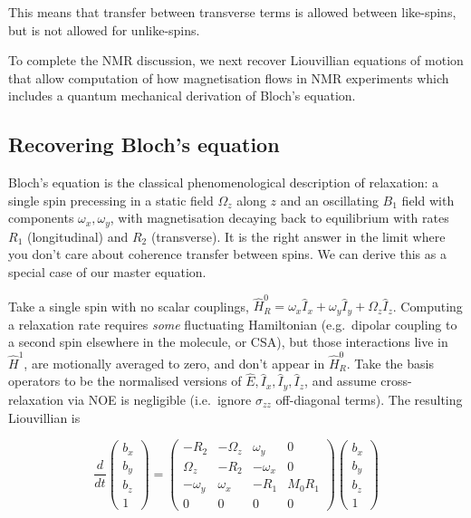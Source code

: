 \documentclass[notitlepage,11pt]{article}
\begin{document}
This means that transfer between transverse terms is allowed between like-spins, but is not allowed for unlike-spins.

To complete the NMR discussion, we next recover Liouvillian equations of motion that allow computation of how magnetisation flows in NMR experiments which includes a quantum mechanical derivation of Bloch's equation.


\subsection{Recovering Bloch's equation}

Bloch's equation is the classical phenomenological description of relaxation: a single spin precessing in a static field $\Omega_z$ along $z$ and an oscillating $B_1$ field with components $\omega_x,\omega_y$, with magnetisation decaying back to equilibrium with rates $R_1$ (longitudinal) and $R_2$ (transverse). It is the right answer in the limit where you don't care about coherence transfer between spins. We can derive this as a special case of our master equation.

Take a single spin with no scalar couplings, $\hat{H}^0_R= \omega_x \hat{I}_x + \omega_y \hat{I}_y + \Omega_z \hat{I}_z$. Computing a relaxation rate requires \emph{some} fluctuating Hamiltonian (e.g.\ dipolar coupling to a second spin elsewhere in the molecule, or CSA), but those interactions live in $\hat{H}^1$, are motionally averaged to zero, and don't appear in $\hat{H}^0_R$. Take the basis operators to be the normalised versions of $\hat{E},\hat{I}_x,\hat{I}_y,\hat{I}_z$, and assume cross-relaxation via NOE is negligible (i.e.\ ignore $\sigma_{zz}$ off-diagonal terms). The resulting Liouvillian is

    \begin{equation}
     \frac{d}{dt} \left(\begin{array}{c}  b_x \\ b_y \\ b_z \\ 1  \end{array}\right) = \left(\begin{array}{cccc} -R_2 &  -\Omega_z & \omega_y &  0 \\ \Omega_z & -R_2 & -\omega_x & 0 \\ -\omega_y & \omega_x & -R_1 & M_0 R_1 \\ 0&0&0&0\end{array} \right)
       \left(\begin{array}{c}  b_x \\ b_y \\ b_z \\ 1  \end{array}\right)
      \end{equation}
\end{document}
